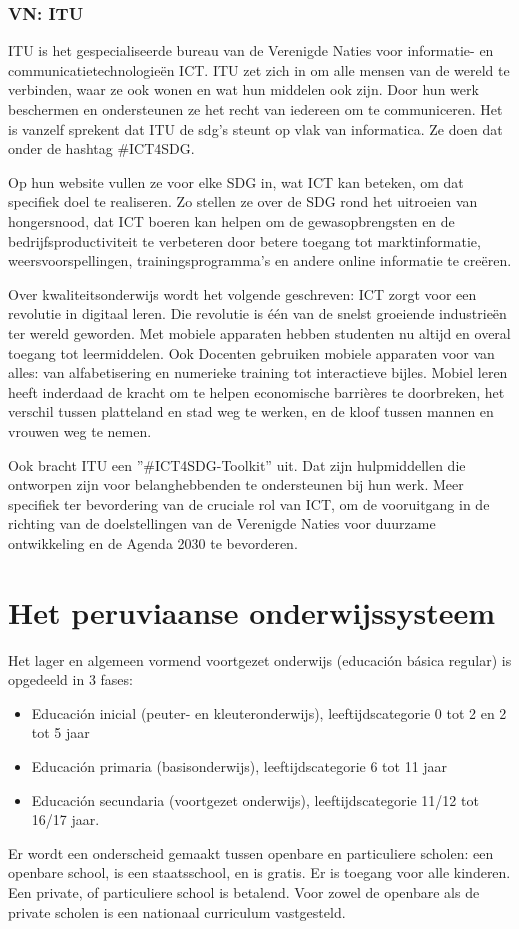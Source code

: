 \subsubsection{VN: ITU}
ITU is het gespecialiseerde bureau van de Verenigde Naties voor informatie- en communicatietechnologieën ICT. ITU zet zich in om alle mensen van de wereld te verbinden, waar ze ook wonen en wat hun middelen ook zijn. Door hun werk beschermen en ondersteunen ze het recht van iedereen om te communiceren.
Het is vanzelf sprekent dat ITU de sdg's steunt op vlak van informatica. Ze doen dat onder de hashtag \#ICT4SDG. \autocite{ITU2015}

Op hun website vullen ze voor elke SDG in, wat ICT kan beteken, om dat  specifiek doel te realiseren. Zo stellen ze over de SDG rond het uitroeien van hongersnood, dat ICT boeren kan helpen om de gewasopbrengsten en de bedrijfsproductiviteit te verbeteren door betere toegang tot marktinformatie, weersvoorspellingen, trainingsprogramma's en andere online informatie te creëren. \autocite{ITU2015}

Over kwaliteitsonderwijs wordt het volgende geschreven: ICT zorgt voor een revolutie in digitaal leren. Die revolutie is één van de snelst groeiende industrieën ter wereld geworden. Met mobiele apparaten hebben studenten nu altijd en overal toegang tot leermiddelen. Ook Docenten gebruiken mobiele apparaten voor van alles: van alfabetisering en numerieke training tot interactieve bijles. Mobiel leren heeft inderdaad de kracht om te helpen economische barrières te doorbreken, het verschil tussen platteland en stad weg te werken, en de kloof tussen mannen en vrouwen weg te nemen. \autocite{ITU2015}

Ook bracht ITU een ''\#ICT4SDG-Toolkit'' uit. Dat zijn hulpmiddellen die ontworpen zijn voor belanghebbenden te ondersteunen bij hun werk. Meer specifiek ter bevordering van de cruciale rol van ICT, om de vooruitgang in de richting van de doelstellingen van de Verenigde Naties voor duurzame ontwikkeling en de Agenda 2030 te bevorderen. \autocite{ITU2015}
 
\section{Het peruviaanse onderwijssysteem}
Het lager en algemeen vormend voortgezet onderwijs (educación básica regular) is opgedeeld in 3 fases:
 \begin{itemize}
\item Educación inicial (peuter- en kleuteronderwijs), leeftijdscategorie 0 tot 2 en 2 tot 5 jaar
\item Educación primaria (basisonderwijs), leeftijdscategorie 6 tot 11 jaar
\item Educación secundaria (voortgezet onderwijs), leeftijdscategorie 11/12 tot 16/17 jaar.
\end{itemize}
Er wordt een onderscheid gemaakt tussen openbare en particuliere scholen: een openbare school, is een staatsschool, en is gratis. Er is toegang voor alle kinderen. Een private, of particuliere school is betalend.  Voor zowel de openbare als de private scholen is een nationaal curriculum vastgesteld. 

